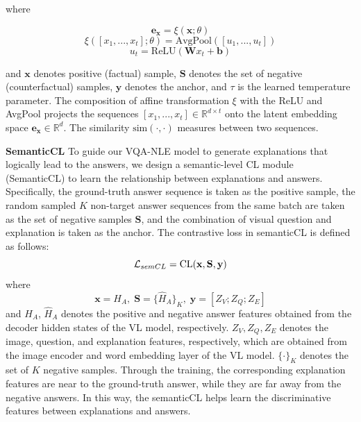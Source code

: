 \documentclass[letterpaper]{article} %
\begin{document}
where

\begin{equation*}
	\mathbf{e_x}=\xi\left(\mathbf{x};\theta \right)
\end{equation*}
\begin{equation*}
	\xi\left([x_1,...,x_t];\theta \right)=\text{AvgPool}([u_1,...,u_t])
\end{equation*}
\begin{equation*}
	u_t = \text{ReLU}(\mathbf{W}x_t+\mathbf{b})
\end{equation*}

and $\mathbf{x}$ denotes positive (factual) sample, $\mathbf{S}$ denotes the set of negative (counterfactual) samples,  $\mathbf{y}$ denotes the anchor, and $\tau$ is the learned temperature parameter. The composition of affine transformation $\xi$ with the ReLU and AvgPool projects the sequences $[x_1,...,x_t]\in\mathbb{R}^{d \times t}$ onto the latent embedding space $\mathbf{e_x} \in \mathbb{R}^d$. The similarity $\text{sim}(\cdot,\cdot)$ measures between two sequences.

\noindent
\textbf{SemanticCL} To guide our VQA-NLE model to generate explanations that logically lead to the answers, we design a semantic-level CL module (SemanticCL) to learn the relationship between explanations and answers. Specifically, the ground-truth answer sequence is taken as the positive sample, the random sampled $K$ non-target answer sequences from the same batch are taken as the set of negative samples $\mathbf{S}$, and the combination of visual question and explanation is taken as the anchor. The contrastive loss in semanticCL is defined as follows:
\begin{equation}
	\mathcal{L}_{semCL} = \text{CL}(\mathbf{x},\mathbf{S},\mathbf{y})\\
\end{equation}
where
\begin{equation*}
	\mathbf{x}={H_A}, \; \mathbf{S}=\{{\hat{H}_A}\}_{K}, \; \mathbf{y}={[Z_V;Z_Q;Z_E]}
\end{equation*}
and ${H_A}$, ${\hat{H}_A}$ denotes the positive and negative answer features obtained from the decoder hidden states of the VL model, respectively. ${Z_V,Z_Q,Z_E}$ denotes the image, question, and explanation features, respectively, which are obtained from the image encoder and word embedding layer of the VL model. $\{\cdot\}_K$ denotes the set of $K$ negative samples. Through the training, the corresponding explanation features are near to the ground-truth answer, while they are far away from the negative answers. In this way, the semanticCL helps learn the discriminative features between explanations and answers.
\end{document}
